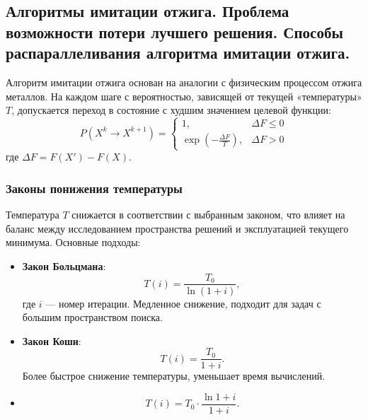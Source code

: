\subsection{Алгоритмы имитации отжига.
Проблема возможности потери лучшего решения.
Способы распараллеливания алгоритма имитации отжига.}

Алгоритм имитации отжига основан на аналогии с физическим процессом отжига металлов. На каждом шаге с вероятностью, зависящей от текущей «температуры» $T$, допускается переход в состояние с худшим значением целевой функции:
\[
P(X^k \to X^{k+1}) = 
\begin{cases} 
1, & \Delta F \leq 0 \\ 
\exp\left(-\frac{\Delta F}{T}\right), & \Delta F > 0 
\end{cases}
\]
где $\Delta F = F(X') - F(X)$. 

\subsubsection*{Законы понижения температуры}
Температура $T$ снижается в соответствии с выбранным законом, что влияет на баланс между исследованием пространства решений и эксплуатацией текущего минимума. Основные подходы:
\begin{itemize}
    \item \textbf{Закон Больцмана}:  
    \[
    T(i) = \frac{T_0}{\ln(1+i)},
    \]
    где $i$ — номер итерации. Медленное снижение, подходит для задач с большим пространством поиска.

    \item \textbf{Закон Коши}:  
    \[
    T(i) = \frac{T_0}{1+i}.
    \]
    Более быстрое снижение температуры, уменьшает время вычислений.

    \item 
	\[
		T(i) = T_0\cdot\frac{\ln{1+i}}{1+i}.
    \]

    \end{itemize}

